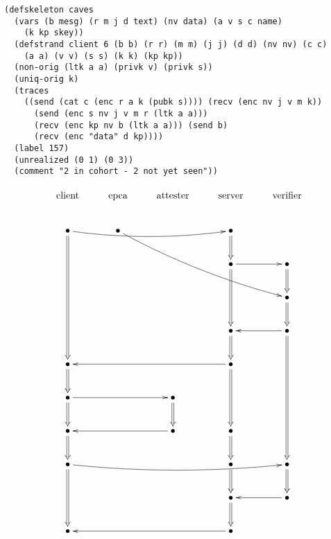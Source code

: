 \documentclass[titlepage,12pt]{article}
\theoremstyle{definition}
\begin{document}
\begin{verbatim}
(defskeleton caves
  (vars (b mesg) (r m j d text) (nv data) (a v s c name)
    (k kp skey))
  (defstrand client 6 (b b) (r r) (m m) (j j) (d d) (nv nv) (c c)
    (a a) (v v) (s s) (k k) (kp kp))
  (non-orig (ltk a a) (privk v) (privk s))
  (uniq-orig k)
  (traces
    ((send (cat c (enc r a k (pubk s)))) (recv (enc nv j v m k))
      (send (enc s nv j v m r (ltk a a)))
      (recv (enc kp nv b (ltk a a))) (send b)
      (recv (enc "data" d kp))))
  (label 157)
  (unrealized (0 1) (0 3))
  (comment "2 in cohort - 2 not yet seen"))
\end{verbatim}

$$\xymatrix{
\txt{\strut client}&\txt{\strut epca}&\txt{\strut attester}&\txt{\strut server}&\txt{\strut verifier}\\
\bullet\ar@{=>}[dddd]\ar@/_/[rrr]&\bullet\ar@/_/[rrrdd]&&\bullet\ar@{=>}[d]&\\
&&&\bullet\ar@{=>}[dd]\ar[r]&\bullet\ar@{=>}[d]\\
&&&&\bullet\ar@{=>}[d]\\
&&&\bullet\ar@{=>}[d]&\bullet\ar@{=>}[dddd]\ar[l]\\
\bullet\ar@{=>}[d]&&&\bullet\ar@{=>}[dd]\ar[lll]&\\
\bullet\ar@{=>}[d]\ar[rr]&&\bullet\ar@{=>}[d]&&\\
\bullet\ar@{=>}[d]&&\bullet\ar[ll]&\bullet\ar@{=>}[d]&\\
\bullet\ar@{=>}[dd]\ar@/_/[rrrr]&&&\bullet\ar@{=>}[d]&\bullet\ar@{=>}[d]\\
&&&\bullet\ar@{=>}[d]&\bullet\ar[l]\\
\bullet&&&\bullet\ar[lll]&}$$
\end{document}
